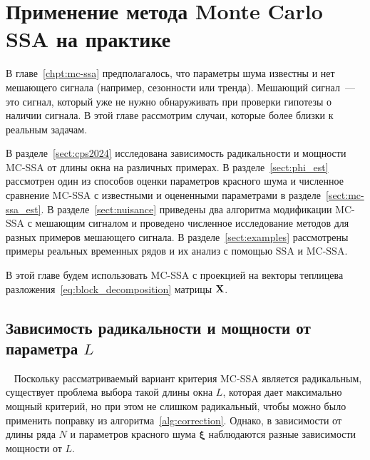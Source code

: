 \documentclass[specialist,
substylefile = spbu_report.rtx,
subf,href,colorlinks=true, 12pt]{disser}
\theoremstyle{definition}
\newcommand{\bfxi}{\boldsymbol{\xi}}
\begin{document}

\chapter{Применение метода Monte Carlo SSA на практике}\label{chpt:mc_ssa_real}
В главе~\ref{chpt:mc-ssa} предполагалось, что параметры шума известны и нет мешающего сигнала (например, сезонности или тренда). Мешающий сигнал~--- это сигнал, который уже не нужно обнаруживать при проверки гипотезы о наличии сигнала.  В этой главе рассмотрим случаи, которые более близки к реальным задачам.

В разделе~\ref{sect:cps2024} исследована зависимость радикальности и мощности MC-SSA от длины окна на различных примерах. В разделе~\ref{sect:phi_est} рассмотрен один из способов оценки параметров красного шума и численное сравнение MC-SSA с известными и оцененными параметрами в разделе~\ref{sect:mc-ssa_est}. В разделе~\ref{sect:nuisance} приведены два алгоритма модификации MC-SSA с мешающим сигналом и проведено численное исследование методов для разных примеров мешающего сигнала. В разделе~\ref{sect:examples} рассмотрены примеры реальных временных рядов и их анализ с помощью SSA и MC-SSA.


В этой главе будем использовать MC-SSA с проекцией на векторы теплицева разложения~\eqref{eq:block_decomposition}
матрицы $\mathbf{X}$.

\section{Зависимость радикальности и мощности от параметра $L$}~\label{sect:cps2024}
Поскольку рассматриваемый вариант критерия MC-SSA является радикальным, существует проблема выбора такой длины окна $L$, которая дает максимально мощный критерий, но при этом не слишком радикальный, чтобы можно было применить поправку из алгоритма~\ref{alg:correction}. Однако, в зависимости от длины ряда $N$ и параметров красного шума $\bfxi$ наблюдаются разные зависимости мощности от $L$.
\end{document}
